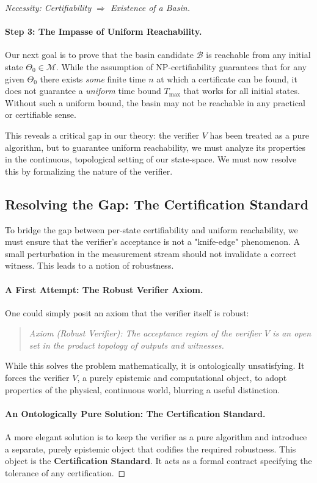 \documentclass[12pt]{article}
\theoremstyle{definition}
\theoremstyle{plain}
\begin{document}
\begin{proof}[Necessity: Certifiability $\Rightarrow$ Existence of a Basin]
\paragraph{Step 3: The Impasse of Uniform Reachability.}
Our next goal is to prove that the basin candidate $\mathcal{B}$ is reachable from any initial state $\Theta_0 \in \mathcal{M}$. While the assumption of NP-certifiability guarantees that for any given $\Theta_0$ there exists \textit{some} finite time $n$ at which a certificate can be found, it does not guarantee a \textit{uniform} time bound $T_{\max}$ that works for all initial states. Without such a uniform bound, the basin may not be reachable in any practical or certifiable sense.

This reveals a critical gap in our theory: the verifier $V$ has been treated as a pure algorithm, but to guarantee uniform reachability, we must analyze its properties in the continuous, topological setting of our state-space. We must now resolve this by formalizing the nature of the verifier.

\subsection*{Resolving the Gap: The Certification Standard}

To bridge the gap between per-state certifiability and uniform reachability, we must ensure that the verifier's acceptance is not a "knife-edge" phenomenon. A small perturbation in the measurement stream should not invalidate a correct witness. This leads to a notion of robustness.

\paragraph{A First Attempt: The Robust Verifier Axiom.}
One could simply posit an axiom that the verifier itself is robust:
\begin{quote}
\textit{Axiom (Robust Verifier): The acceptance region of the verifier $V$ is an open set in the product topology of outputs and witnesses.}
\end{quote}
While this solves the problem mathematically, it is ontologically unsatisfying. It forces the verifier $V$, a purely epistemic and computational object, to adopt properties of the physical, continuous world, blurring a useful distinction.

\paragraph{An Ontologically Pure Solution: The Certification Standard.}
A more elegant solution is to keep the verifier as a pure algorithm and introduce a separate, purely epistemic object that codifies the required robustness. This object is the \textbf{Certification Standard}. It acts as a formal contract specifying the tolerance of any certification.


\end{proof}
\end{document}
